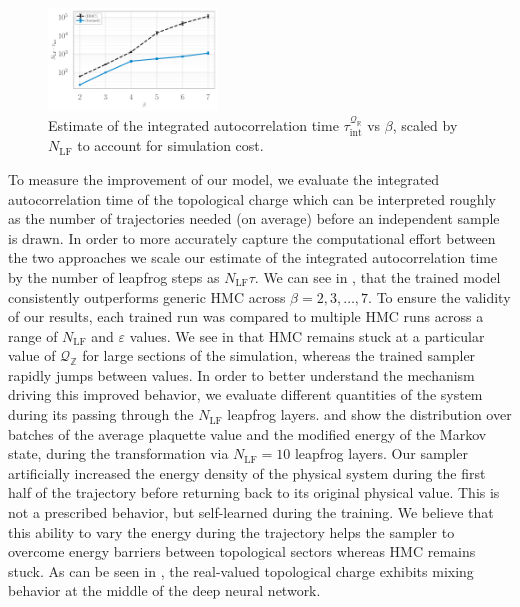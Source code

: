 \documentclass{article} %
\begin{document}
\begin{figure}
   \centering
      \centering
      \includegraphics[width=0.4\textwidth]{figures/autocorr_vs_beta_blue_2120.pdf}
      \caption{\label{fig:autocorrvsbeta}Estimate of the integrated autocorrelation time
      \(\tau_{\mathrm{int}}^{\mathcal{Q}_{\mathbb{R}}}\) vs \(\beta\), scaled by \(N_{\mathrm{LF}}\) to account for
   simulation cost.} %
\end{figure}
To measure the improvement of our model, we evaluate the integrated autocorrelation time of the topological charge which can be interpreted roughly as the number of trajectories needed (on average) before an independent sample is drawn.
%
In order to more accurately capture the computational effort between the two approaches we scale our estimate of the integrated autocorrelation time by the number of leapfrog steps as \(N_{\mathrm{LF}}\tau\).
We can see in , that the trained model consistently outperforms generic HMC across \(\beta = 2, 3, \ldots, 7\).
%
To ensure the validity of our results, each trained run was compared to multiple HMC runs across a range of \(N_{\mathrm{LF}}\) and \(\varepsilon\) values.
%
We see in  that HMC remains stuck at a particular value of \(\mathcal{Q}_{\mathbb{Z}}\) for large sections of the simulation, whereas the trained sampler rapidly jumps between values.
%
In order to better understand the mechanism driving this improved behavior, we evaluate different quantities
of the system during its passing through
the $N_{\mathrm{LF}}$ leapfrog layers.%
%
 and  show the distribution over batches of the average plaquette value and the modified energy of the
Markov state, during the transformation via $N_{\mathrm{LF}}=10$ leapfrog layers.
Our sampler artificially increased the energy density of the physical system during the first half of the trajectory before returning back to its original physical value.
This is not a prescribed behavior, but self-learned during the training.
%
We believe that this ability to vary the energy during the trajectory helps the sampler to overcome energy barriers between topological sectors whereas HMC remains stuck.
As can be seen in , the real-valued topological charge exhibits mixing behavior at the middle of the deep neural network.
%
%
\end{document}
